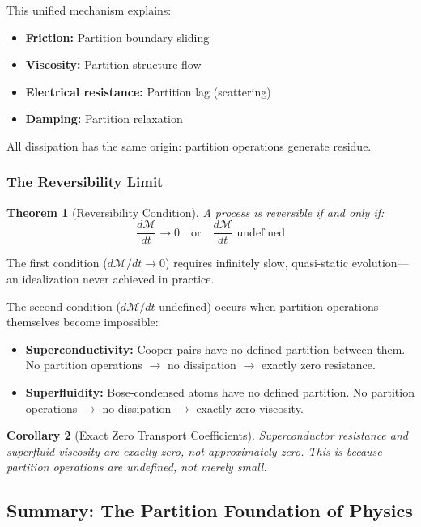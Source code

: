 \documentclass[twocolumn,10pt,a4paper]{article}
\newtheorem{theorem}{Theorem}[section]
\newtheorem{corollary}[theorem]{Corollary}
\theoremstyle{definition}
\theoremstyle{remark}
\newcommand{\Depth}{\mathcal{M}}
\begin{document}
This unified mechanism explains:
\begin{itemize}
    \item \textbf{Friction:} Partition boundary sliding
    \item \textbf{Viscosity:} Partition structure flow
    \item \textbf{Electrical resistance:} Partition lag (scattering)
    \item \textbf{Damping:} Partition relaxation
\end{itemize}

All dissipation has the same origin: partition operations generate residue.

\subsubsection{The Reversibility Limit}

\begin{theorem}[Reversibility Condition]
\label{thm:reversibility}
A process is reversible if and only if:
\begin{equation}
    \frac{d\Depth}{dt} \to 0 \quad \text{or} \quad \frac{d\Depth}{dt} \text{ undefined}
\end{equation}
\end{theorem}

The first condition ($d\Depth/dt \to 0$) requires infinitely slow, quasi-static evolution---an idealization never achieved in practice.

The second condition ($d\Depth/dt$ undefined) occurs when partition operations themselves become impossible:
\begin{itemize}
    \item \textbf{Superconductivity:} Cooper pairs have no defined partition between them. No partition operations $\to$ no dissipation $\to$ exactly zero resistance.
    \item \textbf{Superfluidity:} Bose-condensed atoms have no defined partition. No partition operations $\to$ no dissipation $\to$ exactly zero viscosity.
\end{itemize}

\begin{corollary}[Exact Zero Transport Coefficients]
Superconductor resistance and superfluid viscosity are \emph{exactly} zero, not approximately zero. This is because partition operations are undefined, not merely small.
\end{corollary}

\subsection{Summary: The Partition Foundation of Physics}
\end{document}
